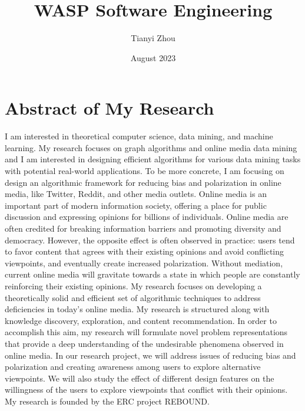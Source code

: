 \documentclass[11pt]{article}
\title{WASP Software Engineering}
\author{Tianyi Zhou}
\date{August 2023}
\begin{document}
\maketitle

\section{Abstract of My Research}
I am interested in theoretical computer science, data mining, and machine learning. My research focuses on graph algorithms and online media data mining and I am interested in designing efficient algorithms for various data mining tasks with potential real-world applications. To be more concrete, I am focusing on design an algorithmic framework for reducing bias and polarization in online media, like Twitter, Reddit, and other media outlets. Online media is an important part of modern information society, offering a place for public discussion and expressing opinions for billions of individuals. Online media are often credited for breaking information barriers and promoting diversity and democracy. However, the opposite effect is often observed in practice: users tend to favor content that agrees with their existing opinions and avoid conflicting viewpoints, and eventually create increased polarization. Without mediation, current online media will gravitate towards a state in which people are constantly reinforcing their existing opinions. My research focuses on developing a theoretically solid and efficient set of algorithmic techniques to address deficiencies in today’s online media. My research is structured along with knowledge discovery, exploration, and content recommendation. In order to accomplish this aim, my research will formulate novel problem representations that provide a deep understanding of the undesirable phenomena observed in online media. In our research project, we will address issues of reducing bias and polarization and creating awareness among users to explore alternative viewpoints. We will also study the effect of different design features on the willingness of the users to explore viewpoints that conflict with their opinions. My research is founded by the ERC project REBOUND.
\end{document}
